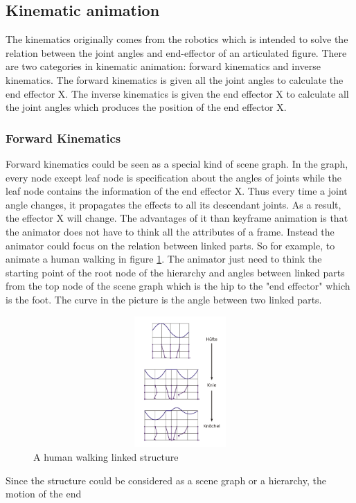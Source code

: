 \subsection{Kinematic animation}
The kinematics originally comes from the robotics which is intended to solve the relation between the joint angles and end-effector 
of an articulated figure. There are two categories in kinematic animation: forward kinematics and inverse kinematics. The forward kinematics is given all the joint angles to calculate the end effector X. The inverse kinematics is given the end effector X to calculate all the joint angles which produces the position of the end effector X.\cite{alan3D}
\subsubsection{Forward Kinematics}
Forward kinematics could be seen as a special kind of scene graph. In the graph, every node except leaf node is specification about the angles of joints while the leaf node contains the information of the end effector X. Thus every time a joint angle changes, it propagates the effects to all its descendant joints. As a result, the effector X will change. The advantages of it than keyframe animation is that the animator does not have to think all the attributes of a frame. Instead the animator could focus on the relation between linked parts.
So for example, to animate a human walking in figure \ref{fig:leg}. The animator just need to think the starting point of the root node of the hierarchy and angles between linked parts from the top node of the scene graph which is the hip to the "end effector" which is the foot. The curve in the picture is the angle between two linked parts.
\begin{figure}[ht!]
\centering
\includegraphics[width=12cm,height=5cm]{figures/leg_animation.png}
\caption{A human walking linked structure \protect\cite{leganima}}
\label{fig:leg}
\end{figure}
Since the structure could be considered as a scene graph or a hierarchy, the motion of the end
